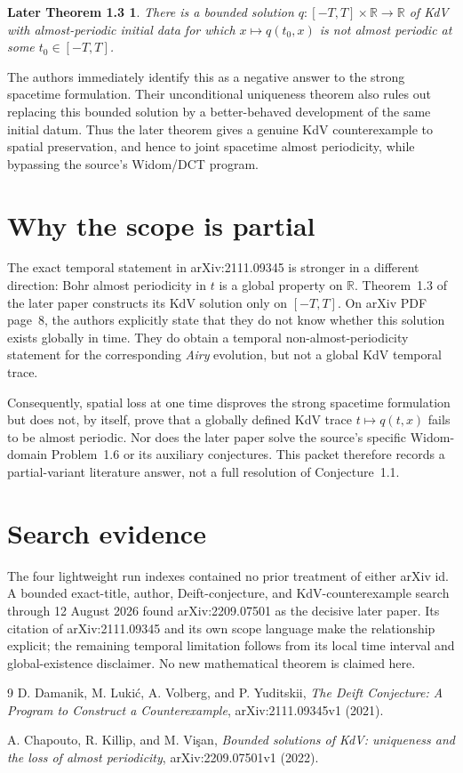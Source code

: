 \documentclass[11pt]{article}
\newtheorem*{later}{Later Theorem 1.3}
\begin{document}
\begin{later}
There is a bounded solution $q:[-T,T]\times\mathbb R\to\mathbb R$ of KdV
with almost-periodic initial data for which
$x\mapsto q(t_0,x)$ is not almost periodic at some
$t_0\in[-T,T]$.
\end{later}

The authors immediately identify this as a negative answer to the strong
spacetime formulation.  Their unconditional uniqueness theorem also rules out
replacing this bounded solution by a better-behaved development of the same
initial datum.  Thus the later theorem gives a genuine KdV counterexample to
spatial preservation, and hence to joint spacetime almost periodicity, while
bypassing the source's Widom/DCT program.

\section{Why the scope is partial}

The exact temporal statement in arXiv:2111.09345 is stronger in a different
direction: Bohr almost periodicity in $t$ is a global property on
$\mathbb R$.  Theorem~1.3 of the later paper constructs its KdV solution only
on $[-T,T]$.  On arXiv PDF page~8, the authors explicitly state that they do
not know whether this solution exists globally in time.  They do obtain a
temporal non-almost-periodicity statement for the corresponding \emph{Airy}
evolution, but not a global KdV temporal trace.

Consequently, spatial loss at one time disproves the strong spacetime
formulation but does not, by itself, prove that a globally defined KdV trace
$t\mapsto q(t,x)$ fails to be almost periodic.  Nor does the later paper solve
the source's specific Widom-domain Problem~1.6 or its auxiliary conjectures.
This packet therefore records a partial-variant literature answer, not a full
resolution of Conjecture~1.1.

\section{Search evidence}

The four lightweight run indexes contained no prior treatment of either arXiv
id.  A bounded exact-title, author, Deift-conjecture, and KdV-counterexample
search through 12 August 2026 found arXiv:2209.07501 as the decisive later
paper.  Its citation of arXiv:2111.09345 and its own scope language make the
relationship explicit; the remaining temporal limitation follows from its
local time interval and global-existence disclaimer.  No new mathematical
theorem is claimed here.

\begin{thebibliography}{9}
D. Damanik, M. Luki\'c, A. Volberg, and P. Yuditskii,
\emph{The Deift Conjecture: A Program to Construct a Counterexample},
arXiv:2111.09345v1 (2021).

A. Chapouto, R. Killip, and M. Vi\c{s}an,
\emph{Bounded solutions of KdV: uniqueness and the loss of almost
periodicity}, arXiv:2209.07501v1 (2022).
\end{thebibliography}
\end{document}
